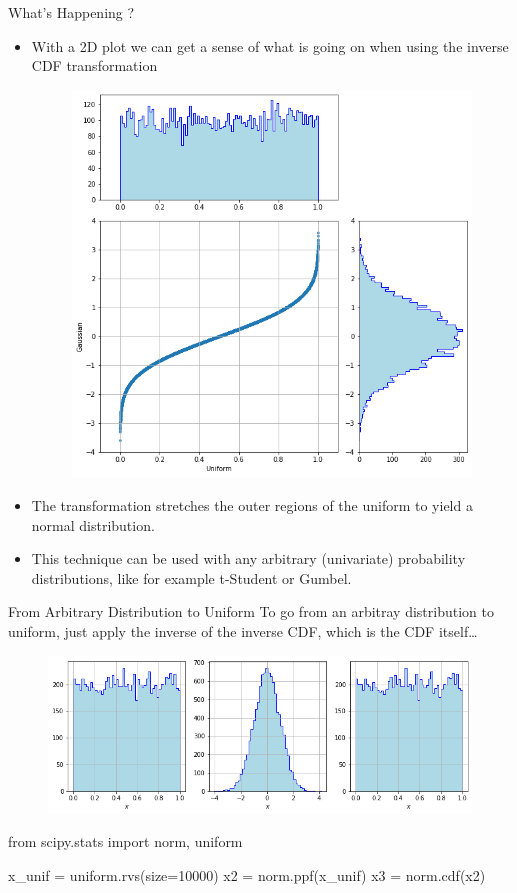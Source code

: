 \documentclass{beamer}
\begin{document}
\begin{frame}{What's Happening ?}
  \begin{itemize}
  \item With a 2D plot we can get a sense of what is going on when using the inverse CDF transformation
    \begin{figure}[h]
      \begin{center}
        \includegraphics[width=0.4\linewidth]{uniform_to_gauss_2d}
      \end{center}
    \end{figure}    
  \item The transformation stretches the outer regions of the uniform to yield a normal distribution. 
  \item This technique can be used with any arbitrary (univariate) probability distributions, like for example t-Student or Gumbel.
  \end{itemize}
\end{frame}

\begin{frame}[fragile]{From Arbitrary Distribution to Uniform}
  To go from an arbitray distribution to uniform, just apply the inverse of the inverse CDF, which is the CDF itself\ldots
  \begin{figure}[h]
    \begin{center}
      \includegraphics[width=0.7\linewidth]{full_chain}
    \end{center}
  \end{figure}
  \begin{ipython}
from scipy.stats import norm, uniform

x_unif = uniform.rvs(size=10000)
x2 = norm.ppf(x_unif)
x3 = norm.cdf(x2)
\end{ipython} 
\end{frame}
\end{document}
